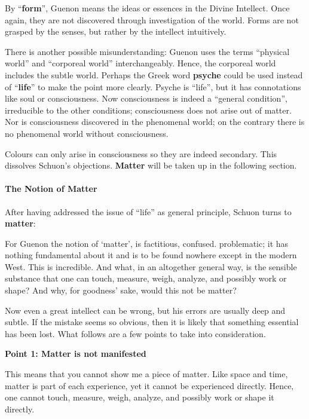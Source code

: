 By ``\textbf{form}'', Guenon means the ideas or essences in the Divine Intellect. Once again, they are not discovered through investigation of the world. Forms are not grasped by the senses, but rather by the intellect intuitively.

There is another possible misunderstanding: Guenon uses the terms ``physical world'' and ``corporeal world'' interchangeably. Hence, the corporeal world includes the subtle world. Perhaps the Greek word \textbf{psyche} could be used instead of ``\textbf{life}'' to make the point more clearly. Psyche is ``life'', but it has connotations like soul or consciousness. Now consciousness is indeed a ``general condition'', irreducible to the other conditions; consciousness does not arise out of matter. Nor is consciousness discovered in the phenomenal world; on the contrary there is no phenomenal world without consciousness.

Colours can only arise in consciousness so they are indeed secondary. This dissolves Schuon's objections. \textbf{Matter} will be taken up in the following section.

\paragraph{The Notion of Matter}


After having addressed the issue of ``life'' as general principle, Schuon turns to \textbf{matter}:

\begin{quotex}
For Guenon the notion of `matter', is factitious, confused. problematic; it has nothing fundamental about it and is to be found nowhere except in the modern West. This is incredible. And what, in an altogether general way, is the sensible substance that one can touch, measure, weigh, analyze, and possibly work or shape? And why, for goodness' sake, would this not be matter?
\end{quotex}


Now even a great intellect can be wrong, but his errors are usually deep and subtle. If the mistake seems so obvious, then it is likely that something essential has been lost. What follows are a few points to take into consideration.

\textbf{Point 1: Matter is not manifested}


This means that you cannot show me a piece of matter. Like space and time, matter is part of each experience, yet it cannot be experienced directly. Hence, one cannot touch, measure, weigh, analyze, and possibly work or shape it directly.

